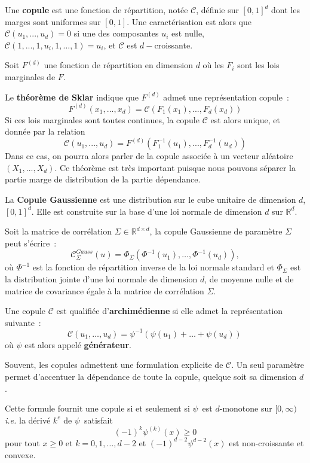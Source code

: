 \begin{f}[Copule]
Une \textbf{copule} est une fonction de répartition, notée \(\mathcal{C}\), définie sur \([0,1]^d\) dont les marges sont uniformes sur \([0,1]\). 
Une caractérisation est alors que \(\mathcal{C}(u_1,...,u_d)=0\) si une des composantes \(u_i\) est nulle, \(\mathcal{C}(1,...,1,u_i,1,...,1)=u_i\), et \(\mathcal{C}\) est \(d-\)croissante.
\medskip
		
Soit \(F^{(d)}\) une fonction de répartition en dimension \(d\)  où les \(F_i\) sont les lois marginales de \(F\). 

Le\textbf{ théorème de Sklar} indique que \(F^{(d)}\) admet une représentation copule~:
\[
F^{(d)} (x_1,...,x_d) = \mathcal{C} (F_1(x_1),...,F_d(x_d))
\]
Si ces lois marginales sont toutes continues, la copule \(\mathcal{C}\) est alors unique, et donnée par la relation 
\[
\mathcal{C}(u_1,...,u_d)=F^{(d)}(F_1^{-1} (u_1),...,F_d^{-1} (u_d))
\]
Dans ce cas, on pourra alors parler de la copule associée à un vecteur aléatoire \((X_1,...,X_d)\).	
Ce théorème est très important puisque nous pouvons séparer la partie marge de distribution de la partie dépendance. 
\medskip
	
La \textbf{Copule Gaussienne} est une distribution sur le cube unitaire de dimension \(d\), \([0,1]^d\). 
Elle est construite sur la base d'une loi normale de dimension \(d\) sur  \(\mathbb{R}^d\).

Soit la matrice de corrélation  \(\Sigma\in\mathbb{R}^{d\times d}\), la copule Gaussienne de paramètre  \(\Sigma\) peut s'écrire~:
\[
\mathcal{C}_\Sigma^{Gauss}(u) = \Phi_\Sigma\left(\Phi^{-1}(u_1),\dots, \Phi^{-1}(u_d) \right), 
\]
où \(\Phi^{-1}\) est la fonction de répartition inverse de la loi normale standard et  \(\Phi_\Sigma\) est la distribution jointe d'une loi normale de dimension \(d\), de moyenne nulle et de matrice de covariance égale à la matrice de corrélation  \(\Sigma\).
\medskip	

	Une copule \(\mathcal{C}\) est qualifiée d'\textbf{archimédienne} si elle admet la représentation suivante~:
\[
\mathcal{C}(u_1,\dots,u_d) = \psi^{-1}\left(\psi(u_1)+\dots+\psi(u_d)\right)\,
\]
où \(\psi\) est alors appelé \textbf{générateur}.

Souvent, les copules  admettent une formulation explicite de  \(\mathcal{C}\). 
Un seul paramètre permet d'accentuer la dépendance de toute la copule, quelque soit sa dimension \(d\).


Cette formule fournit une copule si et seulement si \(\psi\,\) est \(d\)-monotone sur \([0,\infty)\) \emph{i.e.} la dérivé \(k^e\)  de \(\psi\,\) satisfait
\[
(-1)^k\psi^{(k)}(x) \geq 0
\]
pour tout \(x\geq 0\) et \(k=0,1,\dots,d-2\) et \((-1)^{d-2}\psi^{d-2}(x)\) est non-croissante et convexe.
\medskip


\end{f}
